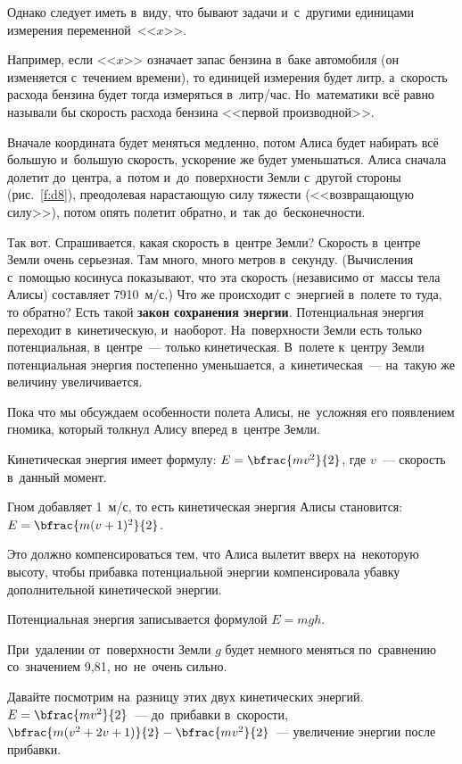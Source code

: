 Однако следует иметь в~виду, что бывают задачи и~с~другими единицами измерения переменной~<<$x$>>.

Например, если <<$x$>> означает запас бензина в~баке автомобиля (он изменяется с~течением времени), то
единицей измерения будет литр,
 а~скорость расхода бензина будет тогда измеряться в~литр/час.
Но~математики всё равно называли бы скорость расхода бензина <<первой производной>>.


Вначале координата будет меняться медленно, потом Алиса будет набирать всё большую и~большую
скорость, ускорение же будет уменьшаться. Алиса сначала долетит до~центра, а~потом и~до~поверхности
Земли с~другой стороны (рис.~\ref{f:d8}), преодолевая нарастающую силу тяжести (<<возвращающую силу>>), потом
опять полетит обратно, и~так до~бесконечности.

Так вот. Спрашивается, какая скорость в~центре Земли? Скорость в~центре Земли очень серьезная. Там
много, много метров в~секунду. (Вычисления с~помощью косинуса показывают, что эта скорость
(независимо от~массы тела Алисы) составляет 7910~м/с.) Что же происходит с~энергией в~полете то
туда, то обратно? Есть такой \textbf{закон сохранения энергии}. Потенциальная энергия переходит
в~кинетическую, и~наоборот. На~поверхности Земли есть только потенциальная, в~центре~--- только
кинетическая. В~полете к~центру Земли потенциальная энергия постепенно уменьшается,
а~кинетическая~--- на~такую же величину увеличивается.

Пока что мы обсуждаем особенности полета Алисы, не~усложняя его появлением гномика, который толкнул
Алису вперед в~центре Земли.

Кинетическая энергия имеет формулу: $E=\bfrac{mv^{2}}{2}$, где $v$~--- скорость в~данный момент.

Гном добавляет 1~м/с, то есть кинетическая энергия Алисы становится: $E=\bfrac{m(v+1)^{2}}{2}$.

\pagebreak

Это должно компенсироваться тем, что Алиса вылетит вверх на~некоторую высоту, чтобы прибавка
потенциальной энергии компенсировала убавку дополнительной кинетической энергии.

Потенциальная энергия записывается формулой $E=mgh$.

При~удалении от~поверхности Земли $g$ будет немного меняться по~сравнению со~значением 9,81,
но~не~очень сильно.

Давайте посмотрим на~разницу этих двух кинетических энергий.
$E=\bfrac{mv^{2}}{2}$~--- до~прибавки в~скорости,
$\bfrac{m(v^{2}+2v+1)}{2}-\bfrac{mv^{2}}{2}$~--- увеличение энергии после прибавки.

